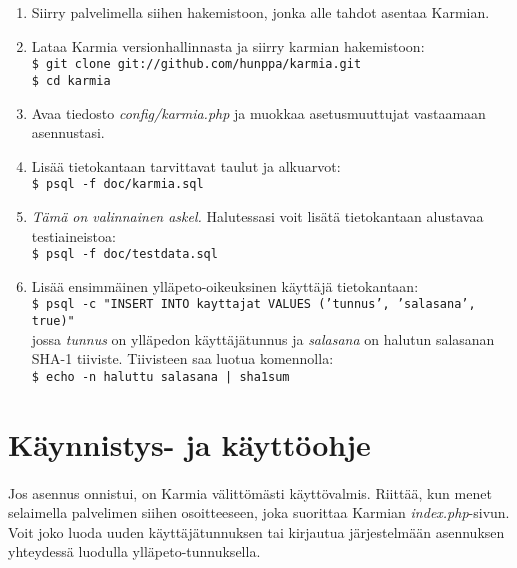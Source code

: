\documentclass[11pt]{article}
\begin{document}
\begin{enumerate}
\item Siirry palvelimella siihen hakemistoon, jonka alle tahdot asentaa Karmian.
\item Lataa Karmia versionhallinnasta ja siirry karmian hakemistoon: \\
\texttt{\$ git clone git://github.com/hunppa/karmia.git} \\
\texttt{\$ cd karmia}
\item Avaa tiedosto \emph{config/karmia.php} ja muokkaa asetusmuuttujat vastaamaan asennustasi.
\item Lisää tietokantaan tarvittavat taulut ja alkuarvot: \\
\texttt{\$ psql -f doc/karmia.sql}
\item \emph{Tämä on valinnainen askel.} Halutessasi voit lisätä tietokantaan alustavaa testiaineistoa: \\
\texttt{\$ psql -f doc/testdata.sql}
\item Lisää ensimmäinen ylläpeto-oikeuksinen käyttäjä tietokantaan: \\
\texttt{\$ psql -c "INSERT INTO kayttajat VALUES ('tunnus', 'salasana', true)"} \\
jossa \emph{tunnus} on ylläpedon käyttäjätunnus ja \emph{salasana} on halutun salasanan SHA-1 tiiviste. Tiivisteen saa luotua komennolla: \\
\texttt{\$ echo -n haluttu salasana | sha1sum}
\end{enumerate}


\section{Käynnistys- ja käyttöohje}

\paragraph{} Jos asennus onnistui, on Karmia välittömästi käyttövalmis. Riittää, kun menet selaimella palvelimen siihen osoitteeseen, joka suorittaa Karmian \mbox{\emph{index.php}}-sivun. Voit joko luoda uuden käyttäjätunnuksen tai kirjautua järjestelmään asennuksen yhteydessä luodulla ylläpeto-tunnuksella.
\end{document}
